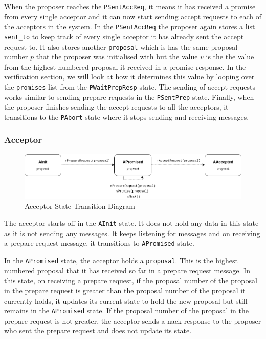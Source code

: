 When the proposer reaches the \texttt{PSentAccReq}, it means it has received a promise
from every single acceptor and it can now start sending accept requests to each
of the acceptors in the system. In the \texttt{PSentAccReq} the proposer again stores
a list \texttt{sent\_to} to keep track of every single acceptor it has already sent the
accept request to. It also stores another \texttt{proposal} which is has the same
proposal number $p$ that the proposer was initialised with but the value $v$ is the
the value from the highest numbered proposal it received in a promise response.
In the verification section, we will look at how it determines this value by looping over
the \texttt{promises} list from the \texttt{PWaitPrepResp} state. The sending of
accept requests works similar to sending prepare requests in the
\texttt{PSentPrep} state. Finally, when the proposer finishes sending the
accept requests to all the acceptors, it transitions to the \texttt{PAbort}
state where it stops sending and receiving messages.


\subsubsection{Acceptor}
\begin{figure}
\centering
\includegraphics[width=\textwidth]{figures/acceptor_state_transitions2.png}
\caption{Acceptor State Transition Diagram
\label{fig:myInlineFigure}}
\end{figure}

The acceptor starts off in the \texttt{AInit} state. It does not hold any data
in this state as it is not sending any messages. It keeps listening for messages
and on receiving a prepare request message, it transitions to \texttt{APromised}
state.

In the \texttt{APromised} state, the acceptor holds a \texttt{proposal}. This is
the highest numbered proposal that it has received so far in a prepare request
message. In this state, on receiving a prepare request, if the proposal number
of the proposal in the prepare request is greater than the proposal number of
the proposal it currently holds, it updates its current state to hold the new
proposal but still remains in the \texttt{APromised} state. If the proposal
number of the proposal in the prepare request is not greater, the acceptor
sends a nack response to the proposer who sent the prepare request and does not
update its state.

